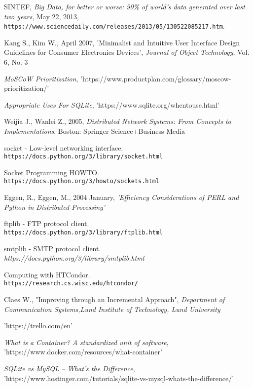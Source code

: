 \documentclass[10pt]{report}
\begin{document}
\newpage
    \begin{thebibliography}{9}
SINTEF,
\textit{Big Data, for better or worse: 90\% of world's data generated over last two years},
May 22, 2013,
\\\texttt{https://www.sciencedaily.com/releases/2013/05/130522085217.htm}.

Kang S., Kim W., April 2007,
'Minimalist and Intuitive User Interface Design Guidelines for Consumer Electronics Devices', \textit{Journal of Object Technology}, Vol. 6, No. 3

\textit{MoSCoW Prioritization}, 'https://www.productplan.com/glossary/moscow-prioritization/'

\textit{Appropriate Uses For SQLite}, 'https://www.sqlite.org/whentouse.html'

Weijia J., Wanlei Z., 2005,
\textit{Distributed Network Systems: From Concepts to Implementations},
Boston: Springer Science+Business Media

socket - Low-level networking interface. \\\texttt{https://docs.python.org/3/library/socket.html}

Socket Programming HOWTO. \\\texttt{https://docs.python.org/3/howto/sockets.html}

Eggen, R., Eggen, M., 2004 January,
\textit{'Efficiency Considerations of  PERL and Python in Distributed Processing'}

ftplib - FTP protocol client. \\\texttt{https://docs.python.org/3/library/ftplib.html}

smtplib - SMTP protocol client.
\\\textit{https://docs.python.org/3/library/smtplib.html}

Computing with HTCondor. \\\texttt{https://research.cs.wisc.edu/htcondor/}

Claes W., "Improving through an Incremental Approach",
\textit{Department of Communication Systems,Lund Institute of Technology, Lund University}

'https://trello.com/en'

\textit{What is a Container? A standardized unit of software}, 'https://www.docker.com/resources/what-container'

\textit{SQLite vs MySQL – What’s the Difference}, 'https://www.hostinger.com/tutorials/sqlite-vs-mysql-whats-the-difference/'

\end{thebibliography}
\end{document}
